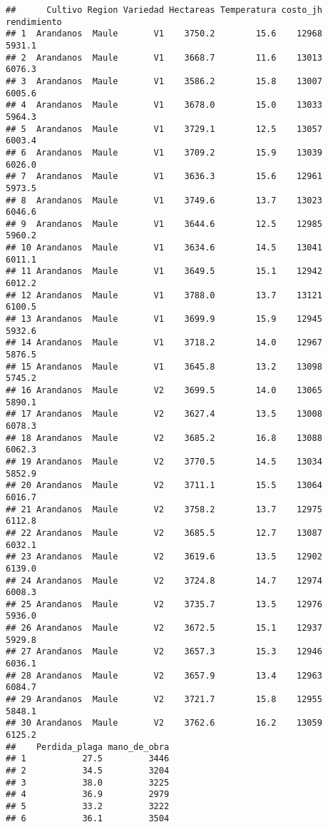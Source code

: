 \documentclass[]{book}
\begin{document}
\begin{verbatim}
##      Cultivo Region Variedad Hectareas Temperatura costo_jh rendimiento
## 1  Arandanos  Maule       V1    3750.2        15.6    12968      5931.1
## 2  Arandanos  Maule       V1    3668.7        11.6    13013      6076.3
## 3  Arandanos  Maule       V1    3586.2        15.8    13007      6005.6
## 4  Arandanos  Maule       V1    3678.0        15.0    13033      5964.3
## 5  Arandanos  Maule       V1    3729.1        12.5    13057      6003.4
## 6  Arandanos  Maule       V1    3709.2        15.9    13039      6026.0
## 7  Arandanos  Maule       V1    3636.3        15.6    12961      5973.5
## 8  Arandanos  Maule       V1    3749.6        13.7    13023      6046.6
## 9  Arandanos  Maule       V1    3644.6        12.5    12985      5960.2
## 10 Arandanos  Maule       V1    3634.6        14.5    13041      6011.1
## 11 Arandanos  Maule       V1    3649.5        15.1    12942      6012.2
## 12 Arandanos  Maule       V1    3788.0        13.7    13121      6100.5
## 13 Arandanos  Maule       V1    3699.9        15.9    12945      5932.6
## 14 Arandanos  Maule       V1    3718.2        14.0    12967      5876.5
## 15 Arandanos  Maule       V1    3645.8        13.2    13098      5745.2
## 16 Arandanos  Maule       V2    3699.5        14.0    13065      5890.1
## 17 Arandanos  Maule       V2    3627.4        13.5    13008      6078.3
## 18 Arandanos  Maule       V2    3685.2        16.8    13088      6062.3
## 19 Arandanos  Maule       V2    3770.5        14.5    13034      5852.9
## 20 Arandanos  Maule       V2    3711.1        15.5    13064      6016.7
## 21 Arandanos  Maule       V2    3758.2        13.7    12975      6112.8
## 22 Arandanos  Maule       V2    3685.5        12.7    13087      6032.1
## 23 Arandanos  Maule       V2    3619.6        13.5    12902      6139.0
## 24 Arandanos  Maule       V2    3724.8        14.7    12974      6008.3
## 25 Arandanos  Maule       V2    3735.7        13.5    12976      5936.0
## 26 Arandanos  Maule       V2    3672.5        15.1    12937      5929.8
## 27 Arandanos  Maule       V2    3657.3        15.3    12946      6036.1
## 28 Arandanos  Maule       V2    3657.9        13.4    12963      6084.7
## 29 Arandanos  Maule       V2    3721.7        15.8    12955      5848.1
## 30 Arandanos  Maule       V2    3762.6        16.2    13059      6125.2
##    Perdida_plaga mano_de_obra
## 1           27.5         3446
## 2           34.5         3204
## 3           38.0         3225
## 4           36.9         2979
## 5           33.2         3222
## 6           36.1         3504

\end{verbatim}
\end{document}
